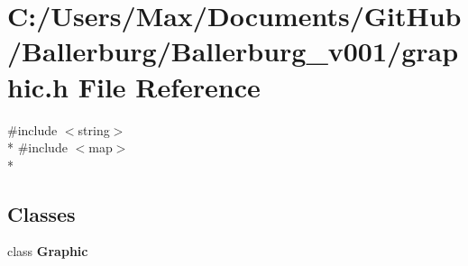 \section{C\+:/\+Users/\+Max/\+Documents/\+Git\+Hub/\+Ballerburg/\+Ballerburg\+\_\+v001/graphic.h File Reference}
\label{graphic_8h}
{\ttfamily \#include $<$string$>$}\\*
{\ttfamily \#include $<$map$>$}\\*
\subsection*{Classes}
\begin{DoxyCompactItemize}
\item 
class {\bf Graphic}
\end{DoxyCompactItemize}
